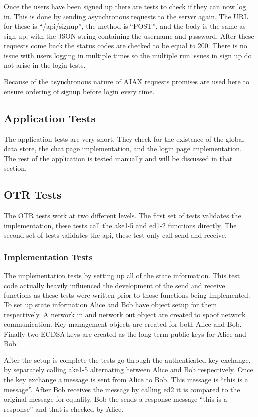 Once the users have been signed up there are tests to check if they can now log in. This is done by sending asynchronous requests to the server again. The URL for these is “/api/signup”, the method is “POST”, and the body is the same as sign up, with the JSON string containing the username and password. After these requests come back the status codes are checked to be equal to 200. There is no issue with users logging in multiple times so the multiple run issues in sign up do not arise in the login tests.


Because of the asynchronous nature of AJAX requests promises are used here to ensure ordering of signup before login every time.


\subsection{Application Tests}


The application tests are very short. They check for the existence of the global data store, the chat page implementation, and the login page implementation. The rest of the application is tested manually and will be discussed in that section.


\subsection{OTR Tests}


The OTR tests work at two different levels. The first set of tests validates the implementation, these tests call the ake1-5 and ed1-2 functions directly. The second set of tests validates the api, these test only call send and receive.


\subsubsection{Implementation Tests}


The implementation tests by setting up all of the state information. This test code actually heavily influenced the development of the send and receive functions as these tests were written prior to those functions being implemented. To set up state information Alice and Bob have object setup for them respectively. A network in and network out object are created to spoof network communication. Key management objects are created for both Alice and Bob. Finally two ECDSA keys are created as the long term public keys for Alice and Bob.


After the setup is complete the tests go through the authenticated key exchange, by separately calling ake1-5 alternating between Alice and Bob respectively. Once the key exchange a message is sent from Alice to Bob. This message is “this is a message”. After Bob receives the message by calling ed2 it is compared to the original message for equality. Bob the sends a response message “this is a response” and that is checked by Alice.


